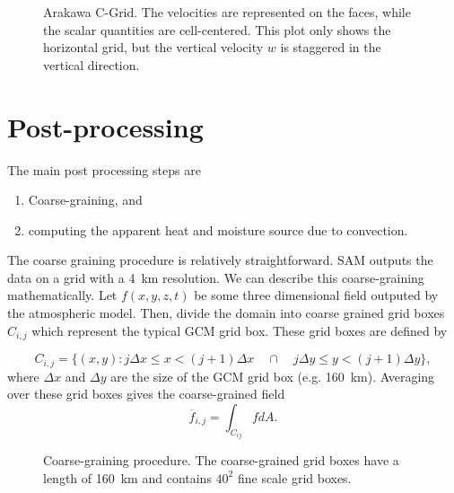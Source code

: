 \documentclass{report}
\begin{document}
\begin{figure}
  \centering


  \caption{Arakawa C-Grid. 
    The velocities are represented on the faces, while the scalar quantities are
    cell-centered. 
    This plot only shows the horizontal grid, but the vertical velocity $w$ is
    staggered in the vertical direction.}
  \label{fig:arakawa-c-grid}
\end{figure}


\section{Post-processing}
\label{sec:post-processing}

The main post processing steps are

\begin{enumerate}
\item Coarse-graining, and 
\item computing the apparent heat and moisture source due to convection.
\end{enumerate}

The coarse graining procedure is relatively straightforward. 
SAM outputs the data on a grid with a \SI{4}{\km} resolution. 
We can describe this coarse-graining mathematically. 
Let $f(x,y,z,t)$ be some three dimensional field outputed by the atmospheric
model. 
Then, divide the domain into coarse grained grid boxes $C_{i,j}$ which represent the
typical GCM grid box. These grid boxes are defined by

\[
  C_{i,j} = \{(x,y):   j \Delta x \leq x < (j+1) \Delta x
  \quad \cap\quad j \Delta y \leq y < (j+1) \Delta y \},
\]
where $\Delta x$ and $\Delta y$ are the size of the GCM grid box (e.g.
\SI{160}{\km}). Averaging over these grid boxes gives the coarse-grained field
\[
  \overline{f}_{i,j} = \int_{C_{ij}} f dA.
\]

\begin{figure}
  \centering
  \caption{Coarse-graining procedure. The coarse-grained grid boxes have a
    length of \SI{160}{km} and contains $40^2$ fine scale grid boxes.}
  \label{fig:coarse-grain}
\end{figure}
\end{document}
